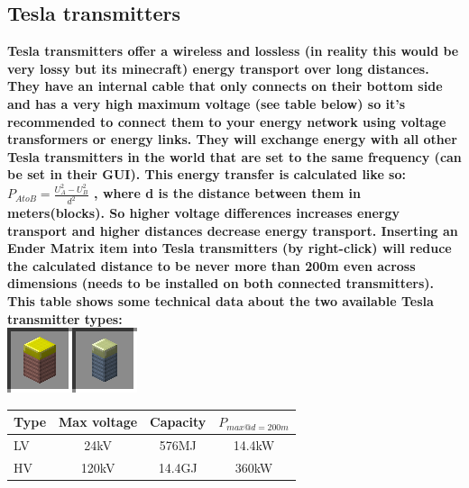 \documentclass[11pt]{article} %
\begin{document}
\subsection{Tesla transmitters}
\bf Tesla transmitters \rm offer a wireless and lossless (in reality this would be very lossy but its minecraft) energy transport over long distances. They have an internal cable that only connects on their bottom side and has a very high maximum voltage (see table below) so it's recommended to connect them to your energy network using voltage transformers or energy links. They will exchange energy with all other Tesla transmitters in the world that are set to the same frequency (can be set in their GUI). This energy transfer is calculated like so: ${P_{A to B} = \frac{U_A^2 - U_B^2}{d^2}}$ , where d is the distance between them in meters(blocks). So higher voltage differences increases energy transport and higher distances decrease energy transport. Inserting an Ender Matrix item into Tesla transmitters (by right-click) will reduce the calculated distance to be never more than 200m even across dimensions (needs to be installed on both connected transmitters). This table shows some technical data about the two  available Tesla transmitter types:\\
\includegraphics[align = m]{blockTesla}
\begin{tabular}{| l | c | c | c |} \hline
\bf Type & \bf Max voltage & \bf Capacity & \bf $P_{max @ d=200m}$ \\ \hline
LV & 24kV & 576MJ & 14.4kW \\
HV & 120kV & 14.4GJ & 360kW \\ \hline
\end{tabular} \\
\end{document}
